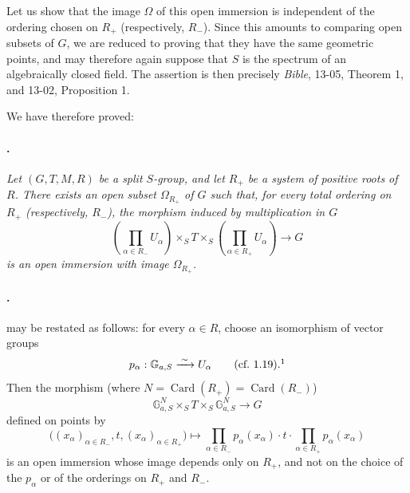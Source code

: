 Let us show that the image \(\Omega\) of this open immersion is
independent of the ordering chosen on \(R_+\)
\textup{(respectively, \(R_-\))}. Since this amounts to comparing
open subsets of \(G\), we are reduced to proving that they have the
same geometric points, and may therefore again suppose that \(S\)
is the spectrum of an algebraically closed field. The assertion is
then precisely \emph{Bible}, 13-05, Theorem 1, and 13-02,
Proposition 1.

We have therefore proved:

\paragraph{.}
\textit{Let \((G,T,M,R)\) be a split \(S\)-group, and let \(R_+\)
be a system of positive roots of \(R\). There exists an open subset
\(\Omega_{R_+}\) of \(G\) such that, for every total ordering on
\(R_+\) \textup{(respectively, \(R_-\))}, the morphism induced by
multiplication in \(G\)}
\[
  \left(\prod_{\alpha\in R_-}U_\alpha\right)
  \times_S T
  \times_S
  \left(\prod_{\alpha\in R_+}U_\alpha\right)
  \longrightarrow G
\]
\textit{is an open immersion with image \(\Omega_{R_+}\).}

\paragraph{.}
 may be restated as follows: for every
\(\alpha\in R\), choose an isomorphism of vector groups
\[
  p_\alpha:\mathbb G_{a,S}\xrightarrow{\;\sim\;}U_\alpha
  \qquad\textup{(cf.\ 1.19)}.\footnotemark
\]
Then the morphism \textup{(where
\(N=\operatorname{Card}(R_+)=\operatorname{Card}(R_-)\))}
\[
  \mathbb G_{a,S}^{N}
  \times_S T
  \times_S
  \mathbb G_{a,S}^{N}
  \longrightarrow G
\]
defined on points by
\[
  \bigl((x_\alpha)_{\alpha\in R_-},t,
        (x_\alpha)_{\alpha\in R_+}\bigr)
  \longmapsto
  \prod_{\alpha\in R_-}p_\alpha(x_\alpha)\mathbin{\cdot}t
  \mathbin{\cdot}\prod_{\alpha\in R_+}p_\alpha(x_\alpha)
\]
is an open immersion whose image depends only on \(R_+\), and not
on the choice of the \(p_\alpha\) or of the orderings on \(R_+\)
and \(R_-\).


